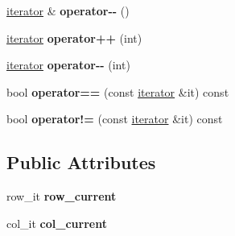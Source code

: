 \begin{DoxyCompactItemize}
\item 
\hyperlink{classspp___1_1_two__d__iterator}{iterator} \& {\bfseries operator-\/-\/} ()\hypertarget{classspp___1_1_two__d__iterator_a74b766bc040635a66634b02673c57ac1}{}\label{classspp___1_1_two__d__iterator_a74b766bc040635a66634b02673c57ac1}

\item 
\hyperlink{classspp___1_1_two__d__iterator}{iterator} {\bfseries operator++} (int)\hypertarget{classspp___1_1_two__d__iterator_a3a3a1470d2672f3087704955eedaec96}{}\label{classspp___1_1_two__d__iterator_a3a3a1470d2672f3087704955eedaec96}

\item 
\hyperlink{classspp___1_1_two__d__iterator}{iterator} {\bfseries operator-\/-\/} (int)\hypertarget{classspp___1_1_two__d__iterator_a97a1318267239507daa9212084b81f77}{}\label{classspp___1_1_two__d__iterator_a97a1318267239507daa9212084b81f77}

\item 
bool {\bfseries operator==} (const \hyperlink{classspp___1_1_two__d__iterator}{iterator} \&it) const \hypertarget{classspp___1_1_two__d__iterator_a407caa8df498cc61dc30b01f31c2106d}{}\label{classspp___1_1_two__d__iterator_a407caa8df498cc61dc30b01f31c2106d}

\item 
bool {\bfseries operator!=} (const \hyperlink{classspp___1_1_two__d__iterator}{iterator} \&it) const \hypertarget{classspp___1_1_two__d__iterator_a18a79094b5f38600072416b20105245b}{}\label{classspp___1_1_two__d__iterator_a18a79094b5f38600072416b20105245b}

\end{DoxyCompactItemize}
\subsection*{Public Attributes}
\begin{DoxyCompactItemize}
\item 
row\+\_\+it {\bfseries row\+\_\+current}\hypertarget{classspp___1_1_two__d__iterator_ac8c85ef5deeb89cc3df3247bd2b6a345}{}\label{classspp___1_1_two__d__iterator_ac8c85ef5deeb89cc3df3247bd2b6a345}

\item 
col\+\_\+it {\bfseries col\+\_\+current}\hypertarget{classspp___1_1_two__d__iterator_ad8599e6a9147ae0c73614b534a5db7c7}{}\label{classspp___1_1_two__d__iterator_ad8599e6a9147ae0c73614b534a5db7c7}

\end{DoxyCompactItemize}
